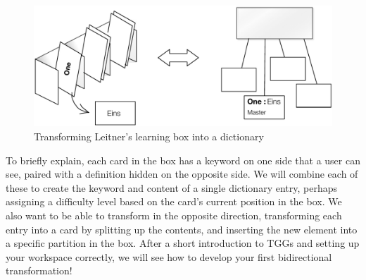 \begin{figure}[htbp]
\begin{center}
  \includegraphics[width=\textwidth]{TGGTransformationExample.pdf}
  \caption{Transforming Leitner's learning box into a dictionary}
  \label{fig:transformIdea}
\end{center}
\end{figure}

\newpage

To briefly explain, each card in the box has a keyword on one side that a user can see, paired with a definition hidden on the opposite side. We will combine
each of these to create the keyword and content of a single dictionary entry, perhaps assigning a difficulty level based on the card's current position in the
box. We also want to be able to transform in the opposite direction, transforming each entry into a card by splitting up the contents, and inserting the new
element into a specific partition in the box. After a short introduction to TGGs and setting up your workspace correctly, we will see how to develop
your first bidirectional transformation!


